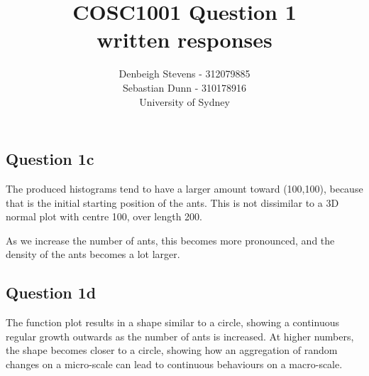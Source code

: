 \documentclass{journal}
\title{COSC1001 Question 1\\ written responses}
\author{Denbeigh Stevens - 312079885\\ Sebastian Dunn - 310178916\\ University of Sydney}
\begin{document}
\begin{flushleft}
\maketitle
\subsection*{Question 1c}
The produced histograms tend to have a larger amount toward (100,100), because that is the initial starting position of the ants.
This is not dissimilar to a 3D normal plot with centre 100, over length 200.

As we increase the number of ants, this becomes more pronounced, and the density of the ants becomes a lot larger.

\subsection*{Question 1d}
The function plot results in a shape similar to a circle, showing a continuous regular growth outwards as the number of ants is increased. At higher numbers, the shape becomes closer to a circle, showing how an aggregation of random changes on a micro-scale can lead to continuous behaviours on a macro-scale.

\end{flushleft}
\end{document}

